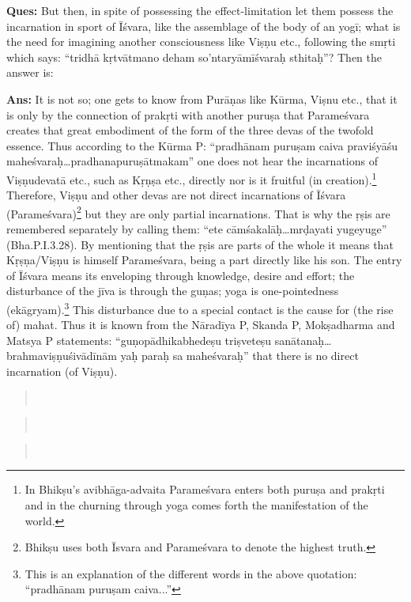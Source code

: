 \textbf{Ques:}  But then, in spite of possessing the effect-limitation let them possess the incarnation in sport of Īśvara, like the assemblage of the body of an yogī; what is the need for imagining another consciousness like Viṣṇu etc., following the smṛti which says: “tridhā kṛtvātmano deham so’ntaryāmīśvaraḥ sthitaḥ”? Then the answer is: 

\textbf{Ans:} It is not so; one gets to know from Purāṇas like Kūrma, Viṣnu etc., that it is only by the connection of prakṛti with another puruṣa that Parameśvara creates that great embodiment of the form of the three devas of the twofold essence. Thus according to the Kūrma P: “pradhānam puruṣam caiva praviśyāśu maheśvaraḥ…pradhanapuruṣātmakam” one does not hear the incarnations of Viṣṇudevatā etc., such as Kṛṇṣa etc., directly nor is it fruitful (in creation).\footnote{In Bhikṣu’s avibhāga-advaita Parameśvara enters both puruṣa and prakṛti and in the churning through yoga comes forth the manifestation of the world.} Therefore, Viṣṇu and other devas are not direct incarnations of Īśvara (Parameśvara)\footnote{Bhikṣu uses both Īsvara and Parameśvara to denote the highest truth.} but they are only partial incarnations. That is why the ṛṣis are remembered separately by calling them: “ete cāmśakalāḥ…mrḍayati yuge\break yuge” (Bha.P.I.3.28). By mentioning that the ṛṣis are parts of the whole it means that Kṛṣṇa/Viṣṇu is himself Parameśvara, being a part directly like his son. The entry of Īśvara means its enveloping through knowledge, desire and effort;   the disturbance of the jīva is through the guṇas; yoga is one-pointedness (ekāgryam).\footnote{This is an explanation of the different words in the above quotation: “pradhānam puruṣam caiva...”} This disturbance due to a special contact is the cause for (the rise of) mahat. Thus it is known from the Nāradīya P, Skanda P, Mokṣadharma and Matsya P statements: “guṇopādhikabhedeṣu triṣveteṣu sanātanaḥ…brahma\-viṣṇuśivādīnām yaḥ paraḥ sa maheśvaraḥ” that there is no direct incarnation (of Viṣṇu).

\begin{verse}
\\
\end{verse}
\begin{verse}
\\
\end{verse}
\begin{verse}
\\
\end{verse}

